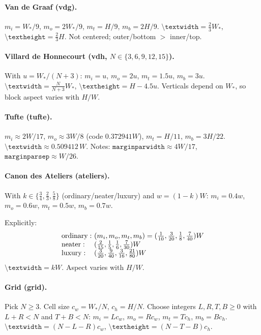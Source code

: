 \documentclass[11pt, twoside, openany]{book}
\newcommand{\cmd}[1]{\texttt{\textbackslash #1}}
\begin{document}
\paragraph{Van de Graaf (vdg).}
$m_i = W_\ast/9$, $m_o = 2W_\ast/9$, $m_t = H/9$, $m_b = 2H/9$. $\cmd{textwidth} = \tfrac{2}{3}W_\ast$, $\cmd{textheight} = \tfrac{2}{3}H$. Not centered; outer/bottom $>$ inner/top.

\paragraph{Villard de Honnecourt (vdh, $N\in\{3,6,9,12,15\}$).}
With $u = W_\ast/(N+3)$: $m_i = u$, $m_o = 2u$, $m_t = 1.5u$, $m_b = 3u$. $\cmd{textwidth} = \tfrac{N}{N+3}W_\ast$, $\cmd{textheight} = H - 4.5u$. Verticals depend on $W_\ast$, so block aspect varies with $H/W$.

\paragraph{Tufte (tufte).}
$m_i \approx 2W/17$, $m_o \approx 3W/8$ (code $0.372941W$), $m_t = H/11$, $m_b = 3H/22$. $\cmd{textwidth} \approx 0.509412\,W$. Notes: $\texttt{marginparwidth} \approx 4W/17$, $\texttt{marginparsep} \approx W/26$.

\paragraph{Canon des Ateliers (ateliers).}
With $k \in \{\tfrac{3}{4}, \tfrac{2}{3}, \tfrac{5}{8}\}$ (ordinary/neater/luxury) and $w = (1-k)W$: $m_i = 0.4w$, $m_o = 0.6w$, $m_t = 0.5w$, $m_b = 0.7w$.

Explicitly:
\[
	\begin{array}{l@{\ }l}
		\mathrm{ordinary:} & (m_i,m_o,m_t,m_b) = (\tfrac{1}{10},\tfrac{3}{20},\tfrac{1}{8},\tfrac{7}{40})W \\
		\mathrm{neater:}   & (\tfrac{2}{15},\tfrac{1}{5},\tfrac{1}{6},\tfrac{7}{30})W                      \\
		\mathrm{luxury:}   & (\tfrac{3}{20},\tfrac{9}{40},\tfrac{3}{16},\tfrac{21}{80})W                   
	\end{array}
\]
$\cmd{textwidth} = kW$. Aspect varies with $H/W$.

\paragraph{Grid (grid).}
Pick $N \geq 3$. Cell size $c_w = W_\ast/N$, $c_h = H/N$. Choose integers $L,R,T,B \geq 0$ with $L+R < N$ and $T+B < N$: $m_i = Lc_w$, $m_o = Rc_w$, $m_t = Tc_h$, $m_b = Bc_h$. $\cmd{textwidth} = (N{-}L{-}R)c_w$, $\cmd{textheight} = (N{-}T{-}B)c_h$.
\end{document}
